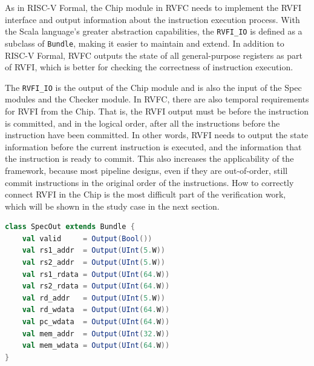 \documentclass[conference]{IEEEtran}
\theoremstyle{definition}
\begin{document}
As in RISC-V Formal, the Chip module in RVFC needs to implement the RVFI interface and output information about the instruction execution process.
With the Scala language's greater abstraction capabilities, the \verb|RVFI_IO| is defined as a subclass of \verb|Bundle|, making it easier to maintain and extend.
In addition to RISC-V Formal, RVFC outputs the state of all general-purpose registers as part of RVFI, which is better for checking the correctness of instruction execution.

The \verb|RVFI_IO| is the output of the Chip module and is also the input of the Spec modules and the Checker module.
In RVFC, there are also temporal requirements for RVFI from the Chip.
That is, the RVFI output must be before the instruction is committed, and in the logical order, after all the instructions before the instruction have been committed.
In other words, RVFI needs to output the state information before the current instruction is executed, and the information that the instruction is ready to commit.
This also increases the applicability of the framework, because most pipeline designs, even if they are out-of-order, still commit instructions in the original order of the instructions.
How to correctly connect RVFI in the Chip is the most difficult part of the verification work, which will be shown in the study case in the next section.

\begin{lstlisting}[language=scala, caption={SpecOut Definition in RVFC}, label=specout]
class SpecOut extends Bundle {
    val valid     = Output(Bool())
    val rs1_addr  = Output(UInt(5.W))
    val rs2_addr  = Output(UInt(5.W))
    val rs1_rdata = Output(UInt(64.W))
    val rs2_rdata = Output(UInt(64.W))
    val rd_addr   = Output(UInt(5.W))
    val rd_wdata  = Output(UInt(64.W))
    val pc_wdata  = Output(UInt(64.W))
    val mem_addr  = Output(UInt(32.W))
    val mem_wdata = Output(UInt(64.W))
}
\end{lstlisting}
\end{document}
